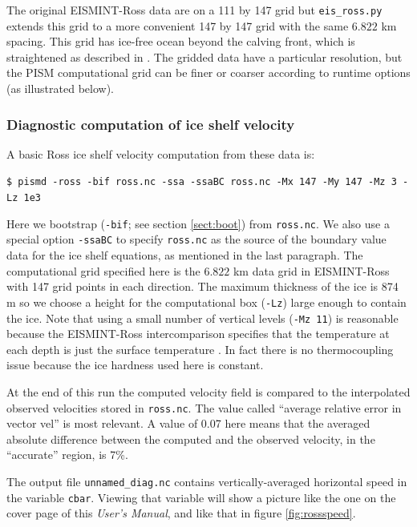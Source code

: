 \documentclass[11pt,final]{amsart}
\begin{document}
The original EISMINT-Ross data are on a 111 by 147 grid but \verb|eis_ross.py| extends this grid to a more convenient 147 by 147 grid with the same $6.822$ km spacing.  This grid has ice-free ocean beyond the calving front, which is straightened as described in \cite{MacAyealetal}.  The gridded data have a particular resolution, but the PISM computational grid can be finer or coarser according to runtime options (as illustrated below).

\subsubsection*{Diagnostic computation of ice shelf velocity}  A basic Ross ice shelf velocity computation from these data is:

\verb|$ pismd -ross -bif ross.nc -ssa -ssaBC ross.nc -Mx 147 -My 147 -Mz 3 -Lz 1e3|

\noindent Here we bootstrap (\verb|-bif|; see section \ref{sect:boot}) from \verb|ross.nc|.  We also use a special option \verb|-ssaBC| to specify \verb|ross.nc| as the source of the boundary value data for the ice shelf equations, as mentioned in the last paragraph.  The computational grid specified here is the $6.822$ km data grid in EISMINT-Ross with 147 grid points in each direction.  The maximum thickness of the ice is 874 m so we choose a height for the computational box (\verb|-Lz|) large enough to contain the ice.  Note that using a small number of vertical levels (\verb|-Mz 11|) is reasonable because the EISMINT-Ross intercomparison specifies that the temperature at each depth is just the surface temperature \cite{MacAyealetal}.  In fact there is no thermocoupling issue because the ice hardness used here is constant.

At the end of this run the computed velocity field is compared to the interpolated observed velocities stored in \verb|ross.nc|.  The value called ``average relative error in vector vel'' is most relevant.  A value of 0.07 here means that the averaged absolute difference between the computed and the observed velocity, in the ``accurate'' region, is 7\%.

The output file \verb|unnamed_diag.nc| contains vertically-averaged horizontal speed in the variable \verb|cbar|.  Viewing that variable will show a picture like the one on the cover page of this \emph{User's Manual}, and like that in figure \ref{fig:rossspeed}.
\end{document}
